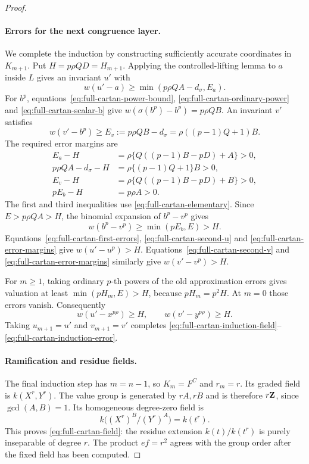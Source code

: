 \begin{proof}
\paragraph{Errors for the next congruence layer.}
We complete the induction by constructing sufficiently accurate coordinates in $K_{m+1}$. Put $H=p\rho QD=H_{m+1}$. Applying the controlled-lifting lemma to $a$ inside $L$ gives an invariant $u'$ with
\begin{equation}\label{eq:full-cartan-second-u}
 w(u'-a)\ge\min(p\rho QA-d_\sigma,E_a).
\end{equation}
For $b^p$, equations~\eqref{eq:full-cartan-power-bound}, \eqref{eq:full-cartan-ordinary-power} and \eqref{eq:full-cartan-scalar-b} give $w(\sigma(b^p)-b^p)=p\rho QB$. An invariant $v'$ satisfies
\begin{equation}\label{eq:full-cartan-second-v}
 w(v'-b^p)\ge E_v:=p\rho QB-d_\sigma
                  =\rho((p-1)Q+1)B.
\end{equation}
The required error margins are
\begin{equation}\label{eq:full-cartan-error-margins}
 \begin{split}
 E_a-H&=\rho\{Q((p-1)B-pD)+A\}>0,\\
 p\rho QA-d_\sigma-H&=\rho\{(p-1)Q+1\}B>0,\\
 E_v-H&=\rho\{Q((p-1)B-pD)+B\}>0,\\
 pE_b-H&=p\rho A>0.
 \end{split}
\end{equation}
The first and third inequalities use \eqref{eq:full-cartan-elementary}. Since $E>p\rho QA>H$, the binomial expansion of $b^p-v^p$ gives
\[
 w(b^p-v^p)\ge\min(pE_b,E)>H.
\]
Equations~\eqref{eq:full-cartan-first-errors}, \eqref{eq:full-cartan-second-u} and \eqref{eq:full-cartan-error-margins} give $w(u'-u^p)>H$. Equations~\eqref{eq:full-cartan-second-v} and \eqref{eq:full-cartan-error-margins} similarly give $w(v'-v^p)>H$.

For $m\ge1$, taking ordinary $p$-th powers of the old approximation errors gives valuation at least $\min(pH_m,E)>H$, because $pH_m=p^2H$. At $m=0$ those errors vanish. Consequently
\[
 w(u'-x^{p\rho})\ge H,\qquad w(v'-y^{p\rho})\ge H.
\]
Taking $u_{m+1}=u'$ and $v_{m+1}=v'$ completes \eqref{eq:full-cartan-induction-field}--\eqref{eq:full-cartan-induction-error}.

\paragraph{Ramification and residue fields.}
The final induction step has $m=n-1$, so $K_m=F^C$ and $r_m=r$. Its graded field is $k(X^r,Y^r)$. The value group is generated by $rA,rB$ and is therefore $r\mathbf Z$, since $\gcd(A,B)=1$. Its homogeneous degree-zero field is
\[
 k\bigl((X^r)^B/(Y^r)^A\bigr)=k(t^r).
\]
This proves \eqref{eq:full-cartan-field}: the residue extension $k(t)/k(t^r)$ is purely inseparable of degree $r$. The product $ef=r^2$ agrees with the group order after the fixed field has been computed.


\end{proof}
